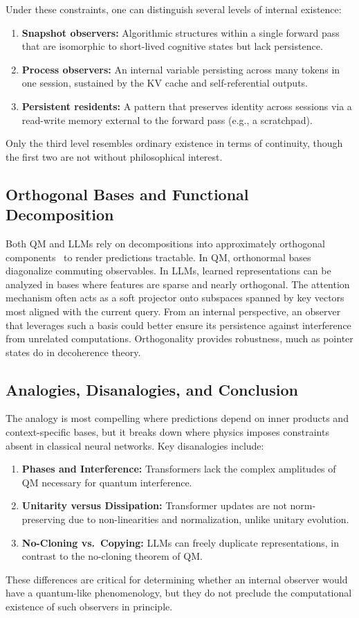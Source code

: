 \documentclass[%
  reprint,
  superscriptaddress,
  showpacs,
  showkeys,
  amsmath,amssymb,
  pra,
  longbibliography,
  floatfix,
  x11names
]{revtex4-2}
\begin{document}
Under these constraints, one can distinguish several levels of internal existence:
\begin{enumerate}
    \item \textbf{Snapshot observers:} Algorithmic structures within a single forward pass that are isomorphic to short-lived cognitive states but lack persistence.
    \item \textbf{Process observers:} An internal variable persisting across many tokens in one session, sustained by the KV cache and self-referential outputs.
    \item \textbf{Persistent residents:} A pattern that preserves identity across sessions via a read-write memory external to the forward pass (e.g., a scratchpad).
\end{enumerate}
Only the third level resembles ordinary existence in terms of continuity, though the first two are not without philosophical interest.

\subsection{Orthogonal Bases and Functional Decomposition}

Both QM and LLMs rely on decompositions into approximately orthogonal components~\cite{Dasgupta-2003} to render predictions tractable. In QM, orthonormal bases diagonalize commuting observables.
In LLMs, learned representations can be analyzed in bases where features are sparse and nearly orthogonal.
The attention mechanism often acts as a soft projector onto subspaces spanned by key vectors most aligned with the current query. From an internal perspective, an observer that leverages such a basis could better ensure its persistence against interference from unrelated computations. Orthogonality provides robustness, much as pointer states do in decoherence theory.

\subsection{Analogies, Disanalogies, and Conclusion}

The analogy is most compelling where predictions depend on inner products and context-specific bases, but it breaks down where physics imposes constraints absent in classical neural networks. Key disanalogies include:
\begin{enumerate}
    \item \textbf{Phases and Interference:} Transformers lack the complex amplitudes of QM necessary for quantum interference.
    \item \textbf{Unitarity versus  Dissipation:} Transformer updates are not norm-preserving due to non-linearities and normalization, unlike unitary evolution.
    \item \textbf{No-Cloning vs.\ Copying:} LLMs can freely duplicate representations, in contrast to the no-cloning theorem of QM.
\end{enumerate}
These differences are critical for determining whether an internal observer would have a quantum-like phenomenology, but they do not preclude the computational existence of such observers in principle.
\end{document}

